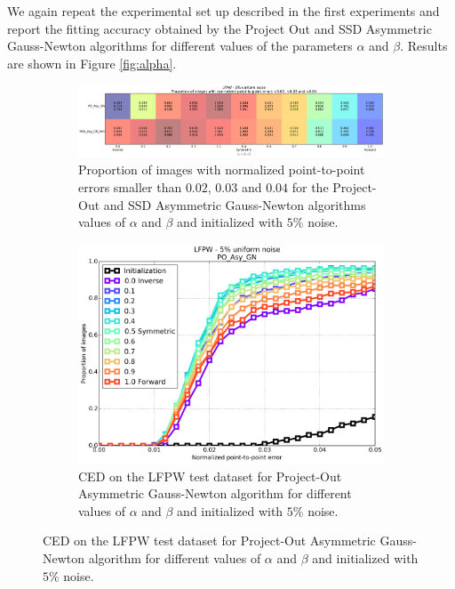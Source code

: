 We again repeat the experimental set up described in the first experiments and report the fitting accuracy obtained by the Project Out and SSD Asymmetric Gauss-Newton algorithms for different values of the parameters $\alpha$ and $\beta$. Results are shown in Figure \ref{fig:alpha}. 

\begin{figure}[h!]
	\centering
	\begin{subfigure}{\textwidth}
	    \includegraphics[width=\textwidth]{experiments/alpha/asy_gn_vs_alpha_5.png}
	    \caption{Proportion of images with normalized point-to-point errors smaller than $0.02$, $0.03$ and $0.04$ for the Project-Out and SSD Asymmetric Gauss-Newton algorithms values of $\alpha$ and $\beta$ and initialized with $5\%$ noise.}
	    \label{fig:ced_po_asy_gn}
	\end{subfigure}
	\par\medskip
	\begin{subfigure}{0.48\textwidth}
	    \includegraphics[width=\textwidth]{experiments/alpha/ced_po_asy_gn_5.png}
	    \caption{CED on the LFPW test dataset for Project-Out Asymmetric Gauss-Newton algorithm for different values of $\alpha$ and $\beta$ and initialized with $5\%$ noise.}
	    \label{fig:ced_po_for_gn}
	\end{subfigure}
	\hfill

\end{figure}

